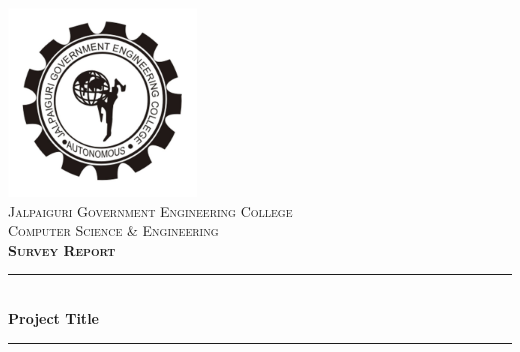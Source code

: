 \documentclass[hidelinks,14pt]{extarticle}
\begin{document}
\begin{titlepage}

\newcommand{\HRule}{\rule{\linewidth}{0.5mm}} %

\center %
 

\includegraphics[width=5cm]{fig/image.jpg}\\[0.3cm] %
 


\textsc{\LARGE Jalpaiguri Government Engineering \newline\newline College}\\[1cm] %
\textsc{\Large Computer Science \& Engineering}\\[0.5cm] %
\textsc{\large \textbf{Survey Report}}\\[0.3cm] %


\HRule \\[0.3cm]
{ \huge \bfseries Project Title }\\[0.3cm] %
\HRule \\[1cm]

 

\end{titlepage}
\end{document}
